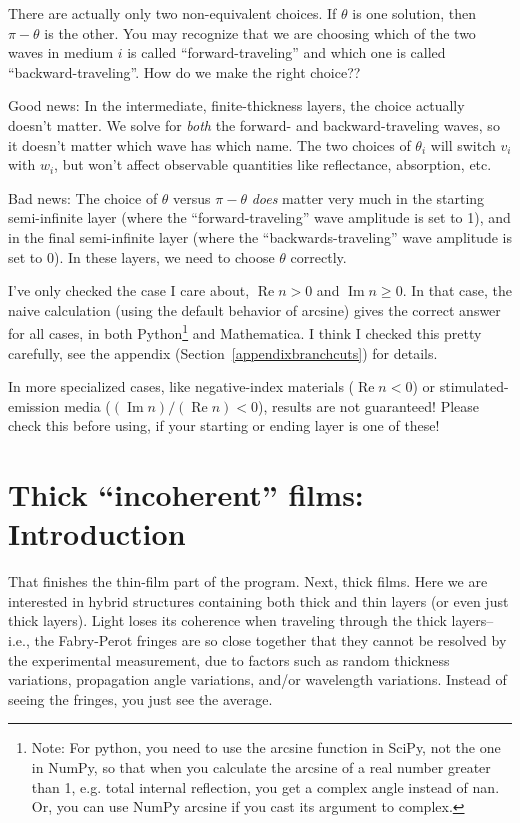 \documentclass[12pt]{article}
\renewcommand{\(}{\left(}
\renewcommand{\)}{\right)}
\renewcommand{\Im}{\operatorname{Im}}
\renewcommand{\Re}{\operatorname{Re}}
\begin{document}
There are actually only two non-equivalent choices. If $\theta$ is one solution, then $\pi-\theta$ is the other. You may recognize that we are choosing which of the two waves in medium $i$ is called ``forward-traveling'' and which one is called ``backward-traveling''. How do we make the right choice??

Good news: In the intermediate, finite-thickness layers, the choice actually doesn't matter. We solve for \emph{both} the forward- and backward-traveling waves, so it doesn't matter which wave has which name. The two choices of $\theta_i$ will switch $v_i$ with $w_i$, but won't affect observable quantities like reflectance, absorption, etc.

Bad news: The choice of $\theta$ versus $\pi-\theta$ \emph{does} matter very much in the starting semi-infinite layer (where the ``forward-traveling'' wave amplitude is set to 1), and in the final semi-infinite layer (where the ``backwards-traveling'' wave amplitude is set to 0). In these layers, we need to choose $\theta$ correctly.

I've only checked the case I care about, $\Re n>0$ and $\Im n \geq 0$. In that case, the naive calculation (using the default behavior of arcsine) gives the correct answer for all cases, in both Python\footnote{Note: For python, you need to use the arcsine function in SciPy, not the one in NumPy, so that when you calculate the arcsine of a real number greater than 1, e.g. total internal reflection, you get a complex angle instead of nan. Or, you can use NumPy arcsine if you cast its argument to complex.} and Mathematica. I think I checked this pretty carefully, see the appendix (Section~\ref{appendixbranchcuts}) for details.

In more specialized cases, like negative-index materials ($\Re n <0$) or stimulated-emission media ($(\Im n)/(\Re n)<0$), results are not guaranteed! Please check this before using, if your starting or ending layer is one of these!

\section{Thick ``incoherent'' films: Introduction}
That finishes the thin-film part of the program. Next, thick films. Here we are interested in hybrid structures containing both thick and thin layers (or even just thick layers). Light loses its coherence when traveling through the thick layers--i.e., the Fabry-Perot fringes are so close together that they cannot be resolved by the experimental measurement, due to factors such as random thickness variations, propagation angle variations, and/or wavelength variations. Instead of seeing the fringes, you just see the average.
\end{document}
